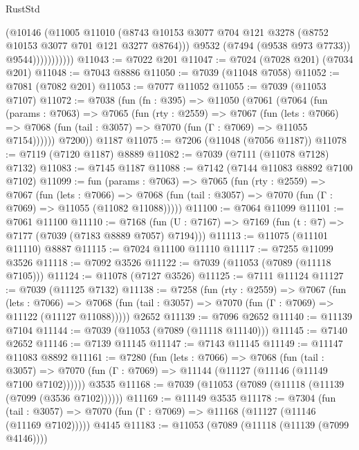 \begin{lexlean}{RustStd}
\begin{coremodule}
{\begin{coremodule}
{{{{{{{{{{{{{{{{{{{{{{{{{{{{{{{{                        (@10146
                          (@11005
                            @11010
                            (@8743
                              @10153
                              @3077
                              @704
                              @121
                              @3278
                              (@8752 @10153 @3077 @701 @121 @3277 @8764)))
                          @9532
                          (@7494 (@9538 @973 @7733))
                          @9544)))))))))))
@11043 := @7022 @201
@11047 := @7024 (@7028 @201) (@7034 @201)
@11048 := @7043 @8886
@11050 := @7039 (@11048 @7058)
@11052 := @7081 (@7082 @201)
@11053 := @7077 @11052
@11055 := @7039 (@11053 @7107)
@11072 := @7038
    (fun (fn : @395) =>
    @11050
      (@7061
        (@7064
          (fun (params : @7063) =>
          @7065
            (fun (rty : @2559) =>
            @7067
              (fun (lets : @7066) =>
              @7068 (fun (tail : @3057) => @7070 (fun (Γ : @7069) => @11055 @7154))))))
        @7200))
    @1187
@11075 := @7206 (@11048 (@7056 @1187))
@11078 := @7119 (@7120 @1187) @8889
@11082 := @7039 (@7111 (@11078 @7128) @7132)
@11083 := @7145 @1187
@11088 := @7142 (@7144 @11083 @8892 @7100 @7102)
@11099 := fun (params : @7063) =>
  @7065
    (fun (rty : @2559) =>
    @7067
      (fun (lets : @7066) =>
      @7068 (fun (tail : @3057) => @7070 (fun (Γ : @7069) => @11055 (@11082 @11088)))))
@11100 := @7064 @11099
@11101 := @7061 @11100
@11110 := @7168 (fun (U : @7167) => @7169 (fun (t : @7) => @7177 (@7039 (@7183 @8889 @7057) @7194)))
@11113 := @11075 (@11101 @11110) @8887
@11115 := @7024 @11100 @11110
@11117 := @7255 @11099 @3526
@11118 := @7092 @3526
@11122 := @7039 (@11053 (@7089 (@11118 @7105)))
@11124 := @11078 (@7127 @3526)
@11125 := @7111 @11124
@11127 := @7039 (@11125 @7132)
@11138 := @7258
    (fun (rty : @2559) =>
    @7067
      (fun (lets : @7066) =>
      @7068 (fun (tail : @3057) => @7070 (fun (Γ : @7069) => @11122 (@11127 @11088)))))
    @2652
@11139 := @7096 @2652
@11140 := @11139 @7104
@11144 := @7039 (@11053 (@7089 (@11118 @11140)))
@11145 := @7140 @2652
@11146 := @7139 @11145
@11147 := @7143 @11145
@11149 := @11147 @11083 @8892
@11161 := @7280
    (fun (lets : @7066) =>
    @7068
      (fun (tail : @3057) =>
      @7070 (fun (Γ : @7069) => @11144 (@11127 (@11146 (@11149 @7100 @7102))))))
    @3535
@11168 := @7039 (@11053 (@7089 (@11118 (@11139 (@7099 (@3536 @7102))))))
@11169 := @11149 @3535
@11178 := @7304
    (fun (tail : @3057) => @7070 (fun (Γ : @7069) => @11168 (@11127 (@11146 (@11169 @7102)))))
    @4145
@11183 := @11053 (@7089 (@11118 (@11139 (@7099 @4146))))
}}}}}}}}}}}}}}}}}}}}}}}}}}}}}}}}
\end{coremodule}}
\end{coremodule}
\end{lexlean}
